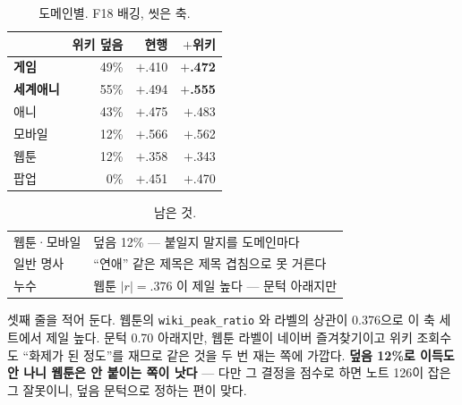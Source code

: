 \documentclass[10pt]{article}
\begin{document}

\begin{table}[t]
\centering\tsize
\caption{도메인별. F18 배깅, 씻은 축.}
\begin{tabular}{lrrr}
\toprule
& 위키 덮음 & 현행 & $+$위키 \\
\midrule
\textbf{게임} & 49\% & $+$.410 & \textbf{$+$.472} \\
\textbf{세계애니} & 55\% & $+$.494 & \textbf{$+$.555} \\
애니 & 43\% & $+$.475 & $+$.483 \\
모바일 & 12\% & $+$.566 & $+$.562 \\
웹툰 & 12\% & $+$.358 & $+$.343 \\
팝업 & 0\% & $+$.451 & $+$.470 \\
\bottomrule
\end{tabular}
\end{table}


\begin{table}[t]
\centering\tsize
\caption{남은 것.}
\begin{tabular}{ll}
\toprule
웹툰·모바일 & 덮음 12\% --- 붙일지 말지를 도메인마다 \\
일반 명사 & ``연애'' 같은 제목은 제목 겹침으로 못 거른다 \\
누수 & 웹툰 $|r|{=}.376$ 이 제일 높다 --- 문턱 아래지만 \\
\bottomrule
\end{tabular}
\end{table}

셋째 줄을 적어 둔다. 웹툰의 \texttt{wiki\_peak\_ratio} 와 라벨의 상관이
0.376으로 이 축 세트에서 제일 높다. 문턱 0.70 아래지만, 웹툰 라벨이 네이버
즐겨찾기이고 위키 조회수도 ``화제가 된 정도''를 재므로 같은 것을 두 번 재는
쪽에 가깝다. \textbf{덮음 12\%로 이득도 안 나니 웹툰은 안 붙이는 쪽이 낫다}
--- 다만 그 결정을 점수로 하면 노트 126이 잡은 그 잘못이니, 덮음 문턱으로
정하는 편이 맞다.
\end{document}
